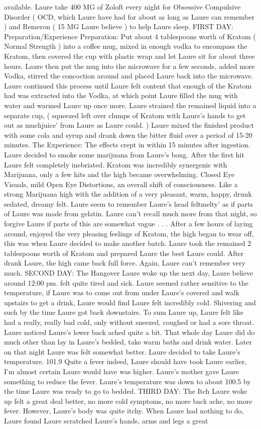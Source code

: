 \documentclass[12pt]{book}
\begin{document}
available. Laure take 400 MG of Zoloft every night for Obsessive Compulsive Disorder ( OCD, which Laure have had for about as long as Laure can remember ) and Remeron ( 15 MG Laure believe ) to help Laure sleep. FIRST DAY: Preparation/Experience Preparation: Put about 4 tablespoons worth of Kratom ( Normal Strength ) into a coffee mug, mixed in enough vodka to encompass the Kratom, then covered the cup with plastic wrap and let Laure sit for about three hours. Laure then put the mug into the microwave for a few seconds, added more Vodka, stirred the concoction around and placed Laure back into the microwave. Laure continued this process until Laure felt content that enough of the Kratom had was extracted into the Vodka, at which point Laure filled the mug with water and warmed Laure up once more. Laure strained the remained liquid into a separate cup, ( squeezed left over clumps of Kratom with Laure's hands to get out as muchjuice' from Laure as Laure could. ) Laure mixed the finished product with some cola and syrup and drank down the bitter fluid over a period of 15-20 minutes. The Experience: The effects crept in within 15 minutes after ingestion. Laure decided to smoke some marijuana from Laure's bong. After the first hit Laure felt completely inebriated. Kratom was incredibly synergenic with Marijuana, only a few hits and the high became overwhelming. Closed Eye Visuals, mild Open Eye Distortions, an overall shift of consciousness. Like a strong Marijuana high with the addition of a very pleasant, warm, happy, drunk sedated, dreamy felt. Laure seem to remember Laure's head feltmelty' as if parts of Laure was made from gelatin. Laure can't recall much more from that night, so forgive Laure if parts of this are somewhat vague . . .  After a few hours of laying around, enjoyed the very pleasing feelings of Kratom, the high began to wear off, this was when Laure decided to make another batch. Laure took the remained 2 tablespoons worth of Kratom and prepared Laure the best Laure could. After drank Laure, the high came back full force. Again, Laure can't remember very much. SECOND DAY: The Hangover Laure woke up the next day, Laure believe around 12:00 pm. felt quite tired and sick. Laure seemed rather sensitive to the temperature, if Laure was to come out from under Laure's covered and walk upstairs to get a drink, Laure would find Laure felt incredibly cold. Shivering and such by the time Laure got back downstairs. To sum Laure up, Laure felt like had a really, really bad cold, only without sneezed, coughed or had a sore throat. Laure noticed Laure's lower back ached quite a bit. That whole day Laure did do much other than lay in Laure's bedded, take warm baths and drink water. Later on that night Laure was felt somewhat better. Laure decided to take Laure's temperature. 101.9 Quite a fever indeed, Laure should have took Laure earlier, I'm almost certain Laure would have was higher. Laure's mother gave Laure something to reduce the fever. Laure's temperature was down to about 100.5 by the time Laure was ready to go to bedded. THIRD DAY: The Itch Laure woke up felt a great deal better, no more cold symptoms, no more back ache, no more fever. However, Laure's body was quite itchy. When Laure had nothing to do, Laure found Laure scratched Laure's hands, arms and legs a great 
\end{document}
